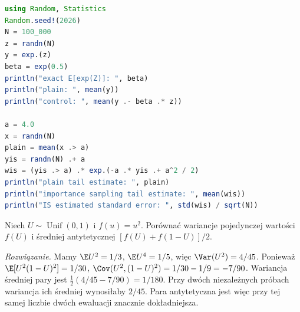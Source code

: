 \begin{lstlisting}[language=Julia,caption={Kompletny program: redukcja wariancji przez zmienną kontrolną i estymacja rzadkiego ogona (Julia, Random i Statistics).}]
using Random, Statistics
Random.seed!(2026)
N = 100_000
z = randn(N)
y = exp.(z)
beta = exp(0.5)
println("exact E[exp(Z)]: ", beta)
println("plain: ", mean(y))
println("control: ", mean(y .- beta .* z))

a = 4.0
x = randn(N)
plain = mean(x .> a)
yis = randn(N) .+ a
wis = (yis .> a) .* exp.(-a .* yis .+ a^2 / 2)
println("plain tail estimate: ", plain)
println("importance sampling tail estimate: ", mean(wis))
println("IS estimated standard error: ", std(wis) / sqrt(N))
\end{lstlisting}

\begin{zadanie}
Niech $U\sim\operatorname{Unif}(0,1)$ i $f(u)=u^2$.
Porównać wariancje pojedynczej wartości $f(U)$ i
średniej antytetycznej $[f(U)+f(1-U)]/2$.
\par\emph{Rozwiązanie.} Mamy $\E U^2=1/3$,
$\E U^4=1/5$, więc $\Var(U^2)=4/45$.
Ponieważ $\E[U^2(1-U)^2]=1/30$,
$\Cov(U^2,(1-U)^2)=1/30-1/9=-7/90$.
Wariancja średniej pary jest
$\tfrac12(4/45-7/90)=1/180$.
Przy dwóch niezależnych próbach wariancja ich średniej
wynosiłaby $2/45$. Para antytetyczna jest więc przy
tej samej liczbie dwóch ewaluacji znacznie dokładniejsza.
\end{zadanie}



